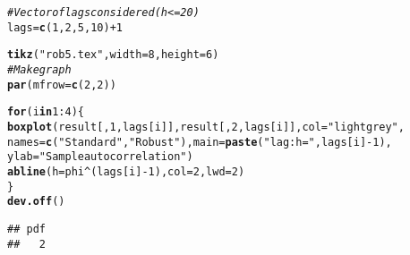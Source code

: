 \documentclass{article}\usepackage[]{graphicx}\usepackage[]{color}
\makeatletter
\newcommand{\hlnum}[1]{\textcolor[rgb]{0.686,0.059,0.569}{#1}}%
\newcommand{\hlstr}[1]{\textcolor[rgb]{0.192,0.494,0.8}{#1}}%
\newcommand{\hlcom}[1]{\textcolor[rgb]{0.678,0.584,0.686}{\textit{#1}}}%
\newcommand{\hlopt}[1]{\textcolor[rgb]{0,0,0}{#1}}%
\newcommand{\hlstd}[1]{\textcolor[rgb]{0.345,0.345,0.345}{#1}}%
\newcommand{\hlkwa}[1]{\textcolor[rgb]{0.161,0.373,0.58}{\textbf{#1}}}%
\newcommand{\hlkwb}[1]{\textcolor[rgb]{0.69,0.353,0.396}{#1}}%
\newcommand{\hlkwc}[1]{\textcolor[rgb]{0.333,0.667,0.333}{#1}}%
\newcommand{\hlkwd}[1]{\textcolor[rgb]{0.737,0.353,0.396}{\textbf{#1}}}%
\newenvironment{kframe}{%
 \def\at@end@of@kframe{}%
 \ifinner\ifhmode%
  \def\at@end@of@kframe{\end{minipage}}%
  \begin{minipage}{\columnwidth}%
 \fi\fi%
 \def\FrameCommand##1{\hskip\@totalleftmargin \hskip-\fboxsep
 \colorbox{shadecolor}{##1}\hskip-\fboxsep
     \hskip-\linewidth \hskip-\@totalleftmargin \hskip\columnwidth}%
 \MakeFramed {\advance\hsize-\width
   \@totalleftmargin\z@ \linewidth\hsize
   \@setminipage}}%
 {\par\unskip\endMakeFramed%
 \at@end@of@kframe}
\newenvironment{knitrout}{}{} %
\makeatother
\begin{document}
\begin{knitrout}
\begin{kframe}
\begin{alltt}
\hlcom{# Vector of lags considered (h <= 20)}
\hlstd{lags} \hlkwb{=} \hlkwd{c}\hlstd{(}\hlnum{1}\hlstd{,}\hlnum{2}\hlstd{,}\hlnum{5}\hlstd{,}\hlnum{10}\hlstd{)} \hlopt{+} \hlnum{1}

\hlkwd{tikz}\hlstd{(}\hlstr{"rob5.tex"}\hlstd{,} \hlkwc{width} \hlstd{=} \hlnum{8}\hlstd{,} \hlkwc{height} \hlstd{=} \hlnum{6}\hlstd{)}
\hlcom{# Make graph}
\hlkwd{par}\hlstd{(}\hlkwc{mfrow} \hlstd{=} \hlkwd{c}\hlstd{(}\hlnum{2}\hlstd{,}\hlnum{2}\hlstd{))}

\hlkwa{for} \hlstd{(i} \hlkwa{in} \hlnum{1}\hlopt{:}\hlnum{4}\hlstd{)\{}
  \hlkwd{boxplot}\hlstd{(result[,}\hlnum{1}\hlstd{,lags[i]], result[,}\hlnum{2}\hlstd{,lags[i]],} \hlkwc{col} \hlstd{=} \hlstr{"lightgrey"}\hlstd{,}
          \hlkwc{names} \hlstd{=} \hlkwd{c}\hlstd{(}\hlstr{"Standard"}\hlstd{,}\hlstr{"Robust"}\hlstd{),} \hlkwc{main} \hlstd{=} \hlkwd{paste}\hlstd{(}\hlstr{"lag: h = "}\hlstd{, lags[i]}\hlopt{-}\hlnum{1}\hlstd{),}
          \hlkwc{ylab} \hlstd{=} \hlstr{"Sample autocorrelation"}\hlstd{)}
  \hlkwd{abline}\hlstd{(}\hlkwc{h} \hlstd{= phi}\hlopt{^}\hlstd{(lags[i]}\hlopt{-}\hlnum{1}\hlstd{),} \hlkwc{col} \hlstd{=} \hlnum{2}\hlstd{,} \hlkwc{lwd} \hlstd{=} \hlnum{2}\hlstd{)}
\hlstd{\}}
\hlkwd{dev.off}\hlstd{()}
\end{alltt}
\begin{verbatim}
## pdf 
##   2
\end{verbatim}
\end{kframe}
\end{knitrout}
\end{document}
